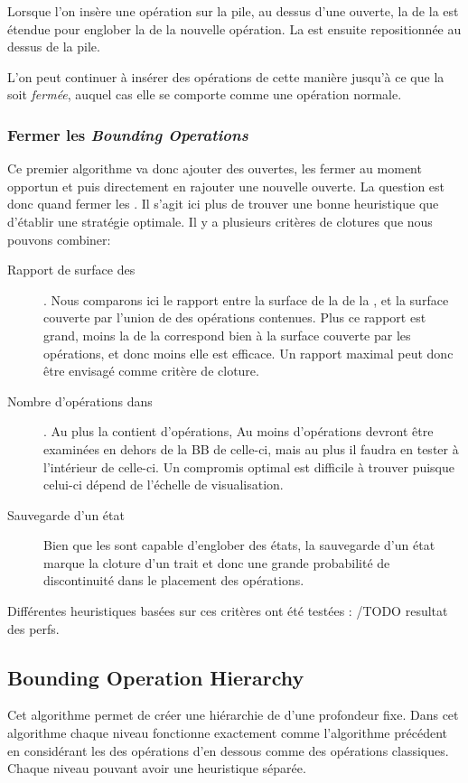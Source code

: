 			Lorsque l'on insère une opération sur la pile, au dessus d'une \BO ouverte, la \BB de la \BO est étendue
			pour englober la \BB de la nouvelle opération. La \BB est ensuite repositionnée au dessus de la pile. 

			L'on peut continuer à insérer des opérations de cette manière jusqu'à ce que la \BO soit \emph{fermée},
			auquel cas elle se comporte comme une opération normale. 

			\subsubsection{Fermer les \emph{Bounding Operations}}
			Ce premier algorithme va donc ajouter des \BO ouvertes, les fermer au moment opportun et puis directement 
			en rajouter une nouvelle ouverte. La question est donc quand fermer les \BO. Il s'agit ici plus
			de trouver une bonne heuristique que d'établir une stratégie optimale. Il y a plusieurs critères de clotures
			que nous pouvons combiner:

			\begin{description}
				\item[Rapport de surface des \BB]. Nous comparons ici le rapport entre la surface de
				la \BB de la \BO, et la surface couverte par l'union de \BB des opérations contenues. Plus ce rapport
				est grand, moins la \BB de la \BO correspond bien à la surface couverte par les opérations, et donc
				moins elle est efficace. Un rapport maximal peut donc être envisagé comme critère de cloture.
				\item[Nombre d'opérations dans \BO]. Au plus la \BO contient d'opérations,
				Au moins d'opérations devront être examinées en dehors de la BB de celle-ci, mais au plus il
				faudra en tester à l'intérieur de celle-ci. Un compromis optimal est difficile à trouver puisque
				celui-ci dépend de l'échelle de visualisation. 

				\item[Sauvegarde d'un état] Bien que les \BO sont capable d'englober des états, la sauvegarde
				d'un état marque la cloture d'un trait et donc une grande probabilité de discontinuité dans
				le placement des opérations. 
			\end{description}
			Différentes heuristiques basées sur ces critères ont été testées : /TODO resultat des perfs.

		\subsection{Bounding Operation Hierarchy}
			Cet algorithme permet de créer une hiérarchie de \BO d'une profondeur fixe. Dans cet algorithme chaque niveau
			fonctionne exactement comme l'algorithme précédent en considérant les \BO des opérations d'en dessous comme
			des opérations classiques. Chaque niveau pouvant avoir une heuristique séparée. 


